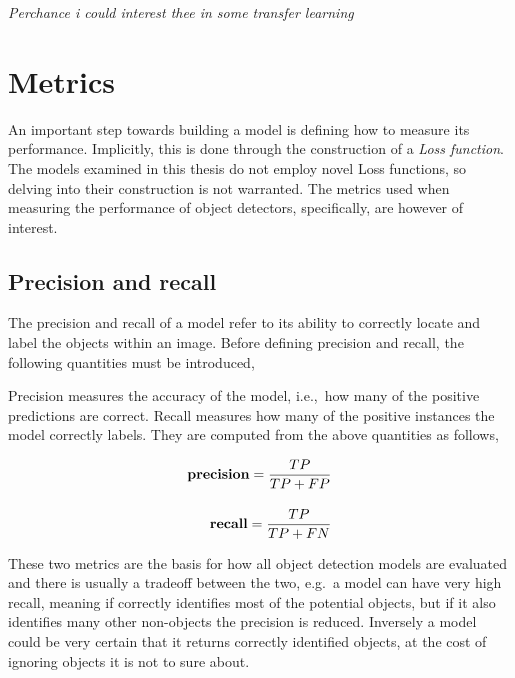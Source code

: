 {\it\color{red}
Perchance i could interest thee in some transfer learning
}

\section{Metrics}\label{sec:back-metrics}
An important step towards building a model is defining how to measure its performance.
Implicitly, this is done through the construction of a \textit{Loss function}.
The models examined in this thesis do not employ novel Loss functions, so delving into their construction is not warranted.
The metrics used when measuring the performance of object detectors, specifically, are however of interest.

\subsection{Precision and recall}
The precision and recall of a model refer to its ability to correctly locate and label the objects within an image.
Before defining precision and recall, the following quantities must be introduced,

\begin{center}
  {\setlength{\fboxsep}{1em}
  }
\end{center}

Precision measures the accuracy of the model, i.e.,~how many of the positive predictions are correct.
Recall measures how many of the positive instances the model correctly labels.
They are computed from the above quantities as follows,

\begin{align*}
  \text{\bf precision}=\frac{TP}{TP+FP}\\[1em]
  \text{\bf recall}=\frac{TP}{TP+FN}
\end{align*}

These two metrics are the basis for how all object detection models are evaluated and there is usually a tradeoff between the two, e.g.\ a model can have very high recall, meaning if correctly identifies most of the potential objects, but if it also identifies many other non-objects the precision is reduced.
Inversely a model could be very certain that it returns correctly identified objects, at the cost of ignoring objects it is not to sure about.

